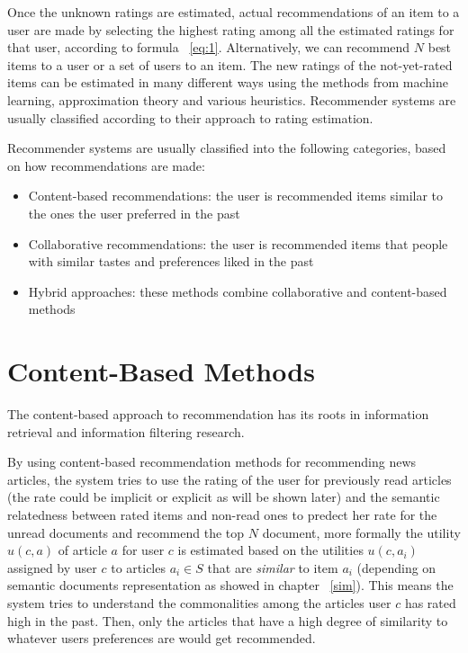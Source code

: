 Once the unknown ratings are estimated, actual recommendations of an item to a user are made by selecting the highest rating among all the estimated ratings for that user, according to formula ~\ref{eq:1}. Alternatively, we can recommend $N$ best items to a user or a set of users to an item.
The new ratings of the not-yet-rated items can be estimated in many different ways using the methods from machine learning, approximation theory and various heuristics. Recommender systems are usually classified according to their approach to rating estimation.

Recommender systems are usually classified into the following categories, based on how recommendations are made:
\begin{itemize}
	\item Content-based recommendations: the user is recommended items similar to the ones the user preferred in the past
	\item Collaborative recommendations: the user is recommended items that people with similar tastes and preferences liked in the past
	\item Hybrid approaches: these methods combine collaborative and content-based methods
\end{itemize}


\section{Content-Based Methods}
The content-based approach to recommendation has its roots in information retrieval \citep{recom_7} \citep{recom_89} and information filtering \citep{recom_10} research.

By using content-based recommendation methods for recommending news articles, the system tries to use the rating of the user for previously read articles (the rate could be implicit or explicit as will be shown later) and the semantic relatedness between rated items and non-read ones to predect her rate for the unread documents and recommend the top $N$ document, more formally the utility $u(c, a)$ of article $a$ for user $c$ is estimated based on the utilities $u(c ,a_i)$  assigned by user $c$ to articles $a_i \in S$ that are \textit{similar} to item $a_i$ (depending on semantic documents representation as showed in chapter ~\ref{sim}). This means the system tries to understand the commonalities among the articles user $c$ has rated high in the past. Then, only the articles that have a high degree of similarity to whatever users preferences are would get recommended.

